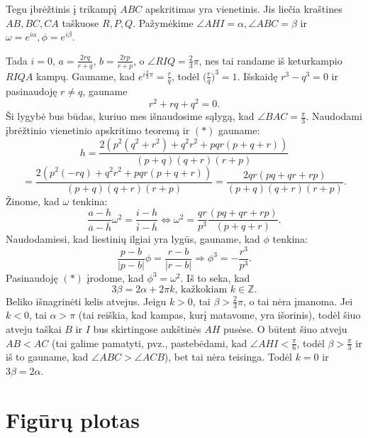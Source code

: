 \documentclass[11pt,a4paper,twoside]{book}
\begin{document}
\begin{sprendimas}
Tegu įbrėžtinis į trikampį $ABC$ apskritimas yra vienetinis. Jis liečia kraštines $AB, BC, CA$ taškuose $R, P, Q$. Pažymėkime $\angle AHI = \alpha, \angle ABC = \beta$ ir $\omega = e^{i\alpha}, \phi = e^{i\beta}$.

Tada $i=0$, $a=\frac{2rq}{r+q}$, $b=\frac{2rp}{r+p}$, o $\angle RIQ=\frac{2}{3}\pi$, nes tai randame iš keturkampio $RIQA$ kampų. Gauname, kad $e^{i\frac{2}{3}\pi}=\frac{r}{q}$, todėl $\Big(\frac{r}{q}\Big)^3=1$. Išskaidę $r^3-q^3=0$ ir pasinaudoję $r\ne q$, gauname
\begin{equation}
r^2 + rq + q^2 = 0. \tag{$*$}
\end{equation}
Ši lygybė bus būdas, kuriuo mes išnaudosime sąlygą, kad $\angle BAC = \frac{\pi}{3}$.
Naudodami įbrėžtinio vienetinio apskritimo teoremą ir $(*)$ gauname:
$$h=\frac{2(p^2(q^2 + r^2) + q^2r^2  + pqr(p + q+ r))}{(p+q)(q+r)(r+p)}$$
$$=\frac{2(p^2(-rq) + q^2r^2  + pqr(p + q+ r))}{(p+q)(q+r)(r+p)}=\frac{2qr(pq +qr+rp)}{(p+q)(q+r)(r+p)}.$$
Žinome, kad $\omega$ tenkina:
$$\frac{a-h}{\overline{a}-\overline{h}}\omega^2=\frac{i-h}{\overline{i}-\overline{h}} \Leftrightarrow \omega^2=\frac{qr}{p^3}\frac{(pq +qr+rp)}{(p+q+r)}.$$
Naudodamiesi, kad liestinių ilgiai yra lygūs, gauname, kad $\phi$ tenkina:
$$\frac{p-b}{|p-b|}\phi=\frac{r-b}{|r-b|} \Rightarrow \phi^3=-\frac{r^3}{p^3}.$$
Pasinaudoję $(*)$ įrodome, kad $\phi^3=\omega^2.$ Iš to seka, kad
$$3\beta=2\alpha + 2\pi k \text{, kažkokiam } k\in\mathbb{Z}.$$
Beliko išnagrinėti kelis atvejus. Jeigu $k>0$, tai $\beta>\frac{2}{3}\pi$, o tai nėra įmanoma. Jei $k<0$, tai $\alpha > \pi$ (tai reiškia, kad kampas, kurį matavome, yra išorinis), todėl šiuo atveju taškai $B$ ir $I$ bus skirtingose aukštinės $AH$ pusėse. O būtent šiuo atveju $AB<AC$ (tai galime pamatyti, pvz., pastebėdami, kad $\angle AHI < \frac{\pi}{6}$, todėl $\beta > \frac{\pi}{3}$ ir iš to gauname, kad $\angle ABC > \angle ACB$), bet tai nėra teisinga. Todėl $k=0$ ir $3\beta=2\alpha$.
\end{sprendimas}


















\section{Figūrų plotas}
\end{document}
